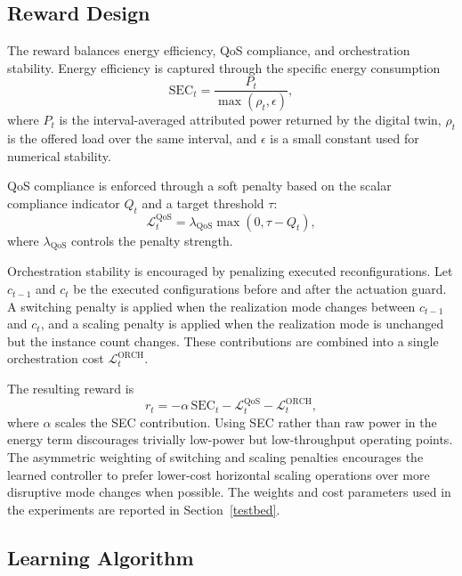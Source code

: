 \documentclass[a4paper,fleqn]{cas-sc}
\begin{document}
\subsection{Reward Design}
\label{subsec:reward}

The reward balances energy efficiency, QoS compliance, and orchestration stability. Energy efficiency is captured through the specific energy consumption
\begin{equation}
\mathrm{SEC}_t=\frac{P_t}{\max(\rho_t,\epsilon)},
\label{eq:sec}
\end{equation}
where $P_t$ is the interval-averaged attributed power returned by the digital twin, $\rho_t$ is the offered load over the same interval, and $\epsilon$ is a small constant used for numerical stability.

QoS compliance is enforced through a soft penalty based on the scalar compliance indicator $Q_t$ and a target threshold $\tau$:
\begin{equation}
\mathcal{L}^{\mathrm{QoS}}_t=\lambda_{\mathrm{QoS}}\max(0,\tau-Q_t),
\label{eq:qos_penalty}
\end{equation}
where $\lambda_{\mathrm{QoS}}$ controls the penalty strength.

Orchestration stability is encouraged by penalizing executed reconfigurations. Let $c_{t-1}$ and $c_t$ be the executed configurations before and after the actuation guard. A switching penalty is applied when the realization mode changes between $c_{t-1}$ and $c_t$, and a scaling penalty is applied when the realization mode is unchanged but the instance count changes. These contributions are combined into a single orchestration cost $\mathcal{L}^{\mathrm{ORCH}}_t$.

The resulting reward is
\begin{equation}
r_t=-\alpha\,\mathrm{SEC}_t-\mathcal{L}^{\mathrm{QoS}}_t-\mathcal{L}^{\mathrm{ORCH}}_t,
\label{eq:reward}
\end{equation}
where $\alpha$ scales the SEC contribution. Using SEC rather than raw power in the energy term discourages trivially low-power but low-throughput operating points. The asymmetric weighting of switching and scaling penalties encourages the learned controller to prefer lower-cost horizontal scaling operations over more disruptive mode changes when possible. The weights and cost parameters used in the experiments are reported in Section~\ref{testbed}.

\subsection{Learning Algorithm}
\label{subsec:rl_algo}
\end{document}
